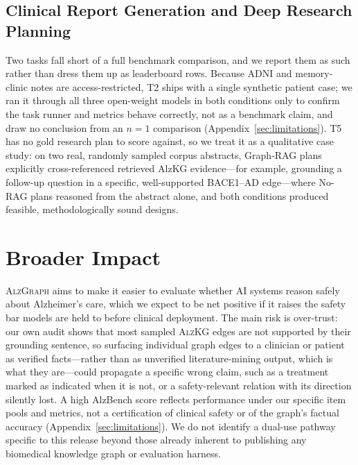 \documentclass{article}
\begin{document}
\subsection{Clinical Report Generation and Deep Research Planning}
\label{sec:t2-illustrative}
Two tasks fall short of a full benchmark comparison, and we report them as such rather than dress them up as leaderboard rows. Because ADNI and memory-clinic notes are access-restricted, T2 ships with a single synthetic patient case; we ran it through all three open-weight models in both conditions only to confirm the task runner and metrics behave correctly, not as a benchmark claim, and draw no conclusion from an $n{=}1$ comparison (Appendix~\ref{sec:limitations}). T5 has no gold research plan to score against, so we treat it as a qualitative case study: on two real, randomly sampled corpus abstracts, Graph-RAG plans explicitly cross-referenced retrieved AlzKG evidence---for example, grounding a follow-up question in a specific, well-supported BACE1--AD edge---where No-RAG plans reasoned from the abstract alone, and both conditions produced feasible, methodologically sound designs.

\section{Broader Impact}
\textsc{AlzGraph} aims to make it easier to evaluate whether AI systems reason safely about Alzheimer's care, which we expect to be net positive if it raises the safety bar models are held to before clinical deployment. The main risk is over-trust: our own audit shows that most sampled \textsc{AlzKG} edges are not supported by their grounding sentence, so surfacing individual graph edges to a clinician or patient as verified facts---rather than as unverified literature-mining output, which is what they are---could propagate a specific wrong claim, such as a treatment marked as indicated when it is not, or a safety-relevant relation with its direction silently lost. A high AlzBench score reflects performance under our specific item pools and metrics, not a certification of clinical safety or of the graph's factual accuracy (Appendix~\ref{sec:limitations}). We do not identify a dual-use pathway specific to this release beyond those already inherent to publishing any biomedical knowledge graph or evaluation harness.
\end{document}
